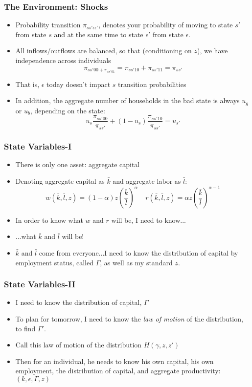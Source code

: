 \documentclass{beamer}
\begin{document}
\begin{frame}
\frametitle[alignment=center]{The Environment: Shocks}
\begin{itemize}
\item Probability transition $\pi_{ss'\epsilon\epsilon'}$, denotes your probability of moving to state $s'$ from state $s$ and at the same time to state $\epsilon'$ from state $\epsilon$.  
\bigskip
\item All inflows/outflows are balanced, so that (conditioning on $z$), we have independence across individuals
$$\pi_{ss'00+\pi_{ss'01}}=\pi_{ss'10}+\pi_{ss'11}=\pi_{ss'}$$
\item<2-> That is, $\epsilon$ today doesn't impact $s$ transition probabilities
\bigskip
\item<3-> In addition, the aggregate number of households in the bad state is always $u_g$ or $u_b$, depending on the state:
$$u_s\frac{\pi_{ss'00}}{\pi_{ss'}}+(1-u_s)\frac{\pi_{ss'10}}{\pi_{ss'}}=u_{s'}$$
\end{itemize}
\end{frame}

\begin{frame}
\frametitle[alignment=center]{State Variables-I}
\begin{itemize}
\item There is only one asset: aggregate capital
\bigskip
\item Denoting aggregate capital as $\bar{k}$ and aggregate labor as $\bar{l}$:
$$w(\bar{k},\bar{l},z)=(1-\alpha)z\left(\frac{\bar{k}}{\bar{l}}\right)^\alpha\ \ \ \ \ r(\bar{k},\bar{l},z)=\alpha z\left(\frac{\bar{k}}{\bar{l}}\right)^{\alpha-1}$$
\item In order to know what $w$ and $r$ will be, I need to know... 
\bigskip
\item ...what $\bar{k}$ and $\bar{l}$ will be!
\bigskip
\item $\bar{k}$ and $\bar{l}$ come from everyone...I need to know the distribution of capital by employment status, called $\Gamma$, as well as my standard $z$.
\end{itemize}
\end{frame}

\begin{frame}
\frametitle[alignment=center]{State Variables-II}
\begin{itemize}
\item I need to know the distribution of capital, $\Gamma$
\bigskip
\item To plan for tomorrow, I need to know the \emph{law of motion} of the distribution, to find $\Gamma'$.  
\bigskip
\item Call this law of motion of the distribution $H(\gamma,z,z')$
\bigskip
\item Then for an individual, he needs to know his own capital, his own employment, the distribution of capital, and aggregate productivity: $(k,\epsilon,\Gamma,z)$
\end{itemize}
\end{frame}
\end{document}
